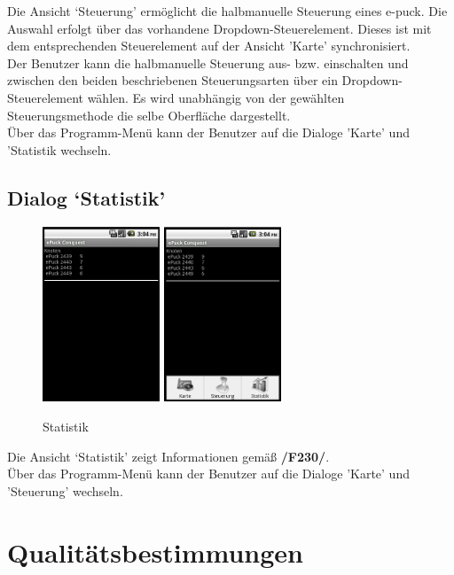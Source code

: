 \documentclass[10pt,a4paper]{article}
\let\oldsection\section
\renewcommand{\section}{\newpage \oldsection}
\begin{document}
			Die Ansicht `Steuerung' ermöglicht die halbmanuelle Steuerung eines e-puck. Die Auswahl erfolgt über das vorhandene
			Dropdown-Steuerelement. Dieses ist mit dem entsprechenden Steuerelement auf der Ansicht 'Karte' synchronisiert.	\\ 
			Der Benutzer kann die halbmanuelle Steuerung	aus- bzw. einschalten und zwischen den beiden beschriebenen
			Steuerungsarten über ein Dropdown-Steuerelement wählen. Es wird unabhängig von der gewählten Steuerungsmethode die selbe
			Oberfläche dargestellt. \\
			Über das Programm-Menü kann der Benutzer auf die Dialoge 'Karte' und 'Statistik wechseln.

			\subsection{Dialog `Statistik'}
				\begin{figure}[h]
					  \centering
					\includegraphics[width=3.5cm]{images/stats_bmp.png}
					\includegraphics[width=3.5cm]{images/stats_menu.png}
  					\caption{Statistik}
  				\end{figure}		
  				
  			Die Ansicht `Statistik' zeigt Informationen gemäß \textbf{/F230/}. \\
  			
  			Über das Programm-Menü kann der Benutzer auf die Dialoge 'Karte' und 'Steuerung' wechseln.
			
	\section{Qualitätsbestimmungen}
		
\end{document}
